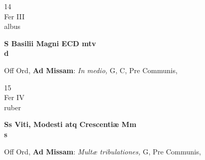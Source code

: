 \documentclass[10pt, openany]{book}
\begin{document}
        \begin{center}
            \begin{minipage}{3.5in}
                \vspace{2em}
                \begin{minipage}{0.5in}
                    {\Huge 14} \\
                    {\normalsize Fer III} \\
                    {\normalsize albus}
                \end{minipage}
                \begin{minipage}{3.0in}
                    \textbf{ \large S Basilii Magni ECD mtv \\
                    \textnormal{\normalsize d}} \\ 
                \end{minipage}
                \begin{justify}Off Ord, \textbf{Ad Missam}: \textit{In medio,} G, C, Pre Communis,  
                \end{justify}
            \end{minipage}
        \end{center}
    
        \begin{center}
            \begin{minipage}{3.5in}
                \vspace{2em}
                \begin{minipage}{0.5in}
                    {\Huge 15} \\
                    {\normalsize Fer IV} \\
                    {\normalsize ruber}
                \end{minipage}
                \begin{minipage}{3.0in}
                    \textbf{ \large Ss Viti, Modesti atq Crescentiæ Mm \\
                    \textnormal{\normalsize s}} \\ 
                \end{minipage}
                \begin{justify}Off Ord, \textbf{Ad Missam}: \textit{Multæ tribulationes,} G, Pre Communis,  
                \end{justify}
            \end{minipage}
        \end{center}
    
\end{document}
